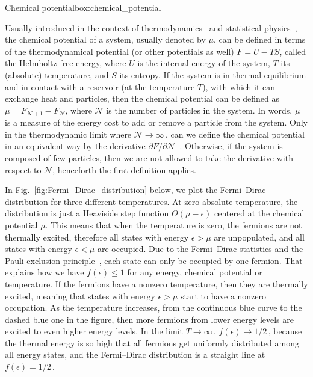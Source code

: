 \begin{mybox}{Chemical potential}{box:chemical_potential}

Usually introduced in the context of thermodynamics~\cite{Blundell_Blundell_2009} and statistical physics~\cite{Huang}, the chemical potential of a system, usually denoted by $\mu$, can be defined in terms of the thermodynamical potential (or other potentials as well) $F=U-TS$, called the Helmholtz free energy, where $U$ is the internal energy of the system, $T$ its (absolute) temperature, and $S$ its entropy.
If the system is in thermal equilibrium and in contact with a reservoir (at the temperature $T$), with which it can exchange heat and particles, then the chemical potential can be defined as $\mu = F_{\mathcal{N} + 1} - F_{\mathcal{N}}$, where $\mathcal{N}$ is the number of particles in the system.
In words, $\mu$ is a measure of the energy cost to add or remove a particle from the system.
Only in the thermodynamic limit where $\mathcal{N} \to \infty$\,, can we define the chemical potential in an equivalent way by the derivative $\partial F/\partial \mathcal{N}$~\cite{Blundell_Blundell_2009}.
Otherwise, if the system is composed of few particles, then we are not allowed to take the derivative with respect to $\mathcal{N}$, henceforth the first definition applies.

In Fig.~\ref{fig:Fermi_Dirac_distribution} below, we plot the Fermi--Dirac distribution for three different temperatures.
At zero absolute temperature, the distribution is just a Heaviside step function $\Theta (\mu - \epsilon)$ centered at the chemical potential $\mu$.
This means that when the temperature is zero, the fermions are not thermally excited, therefore all states with energy $\epsilon > \mu$ are unpopulated, and all states with energy $\epsilon < \mu$ are occupied.
Due to the Fermi--Dirac statistics and the Pauli exclusion principle~\cite{Griffiths_QM_2018}, each state can only be occupied by one fermion.
That explains how we have $f(\epsilon) \leq 1$ for any energy, chemical potential or temperature.
If the fermions have a nonzero temperature, then they are thermally excited, meaning that states with energy $\epsilon > \mu$ start to have a nonzero occupation.
As the temperature increases, from the continuous blue curve to the dashed blue one in the figure, then more fermions from lower energy levels are excited to even higher energy levels.
In the limit $T \to \infty$\,, $f(\epsilon) \to 1/2$\,, because the thermal energy is so high that all fermions get uniformly distributed among all energy states, and the Fermi--Dirac distribution is a straight line at $f(\epsilon) = 1/2$\,.


\end{mybox}
